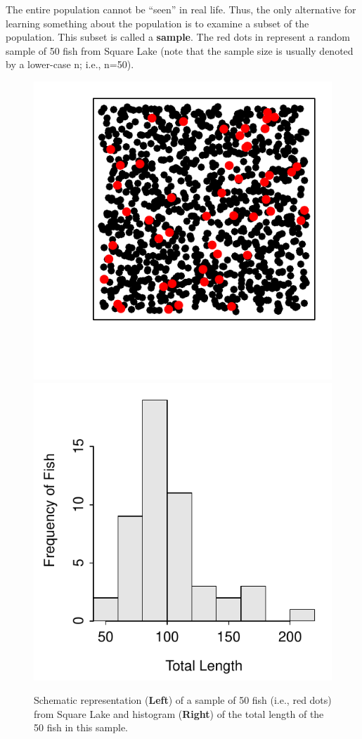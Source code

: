 \documentclass[10pt,openany]{book}\usepackage[]{graphicx}\usepackage[]{color}
\newenvironment{knitrout}{}{} %
\begin{document}

\vspace{-12pt}

The entire population cannot be ``seen'' in real life.  Thus, the only alternative for learning something about the population is to examine a subset of the population.  This subset is called a \textbf{sample}.  The red dots in  represent a random sample of 50 fish from Square Lake (note that the sample size is usually denoted by a lower-case n; i.e., n=50).

\begin{knitrout}
\color{fgcolor}\begin{figure}[hbtp]

{\centering \includegraphics[width=.4\linewidth]{Figs/SquareLakeSample1-1} 
\includegraphics[width=.4\linewidth]{Figs/SquareLakeSample1-2} 

}

\caption{Schematic representation (\textbf{Left}) of a sample of 50 fish (i.e., red dots) from Square Lake and histogram (\textbf{Right}) of the total length of the 50 fish in this sample.}\label{fig:SquareLakeSample1}
\end{figure}


\end{knitrout}
\end{document}
